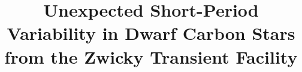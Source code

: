 \documentclass[twocolumn]{aastex631}
\begin{document}
\title{Unexpected Short-Period Variability in Dwarf Carbon Stars from the Zwicky Transient Facility}


\end{document}
